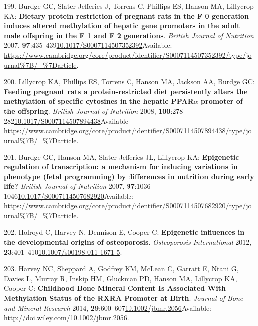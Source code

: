 \documentclass[
]{book}
\begin{document}
\leavevmode\hypertarget{ref-Burdge2007a}{}%
199. Burdge GC, Slater-Jefferies J, Torrens C, Phillips ES, Hanson MA, Lillycrop KA: \textbf{Dietary protein restriction of pregnant rats in the F 0 generation induces altered methylation of hepatic gene promoters in the adult male offspring in the F 1 and F 2 generations}. \emph{British Journal of Nutrition} 2007, \textbf{97}:435--439\href{https://doi.org/10.1017/S0007114507352392}{10.1017/S0007114507352392}Available: \url{https://www.cambridge.org/core/product/identifier/S0007114507352392/type/journal\%7B/_\%7Darticle}.

\leavevmode\hypertarget{ref-Lillycrop2008}{}%
200. Lillycrop KA, Phillips ES, Torrens C, Hanson MA, Jackson AA, Burdge GC: \textbf{Feeding pregnant rats a protein-restricted diet persistently alters the methylation of specific cytosines in the hepatic PPAR\(\alpha\) promoter of the offspring}. \emph{British Journal of Nutrition} 2008, \textbf{100}:278--282\href{https://doi.org/10.1017/S0007114507894438}{10.1017/S0007114507894438}Available: \url{https://www.cambridge.org/core/product/identifier/S0007114507894438/type/journal\%7B/_\%7Darticle}.

\leavevmode\hypertarget{ref-Burdge2007}{}%
201. Burdge GC, Hanson MA, Slater-Jefferies JL, Lillycrop KA: \textbf{Epigenetic regulation of transcription: a mechanism for inducing variations in phenotype (fetal programming) by differences in nutrition during early life?} \emph{British Journal of Nutrition} 2007, \textbf{97}:1036--1046\href{https://doi.org/10.1017/S0007114507682920}{10.1017/S0007114507682920}Available: \url{https://www.cambridge.org/core/product/identifier/S0007114507682920/type/journal\%7B/_\%7Darticle}.

\leavevmode\hypertarget{ref-Holroyd2012}{}%
202. Holroyd C, Harvey N, Dennison E, Cooper C: \textbf{Epigenetic influences in the developmental origins of osteoporosis}. \emph{Osteoporosis International} 2012, \textbf{23}:401--410\href{https://doi.org/10.1007/s00198-011-1671-5}{10.1007/s00198-011-1671-5}.

\leavevmode\hypertarget{ref-Harvey2014d}{}%
203. Harvey NC, Sheppard A, Godfrey KM, McLean C, Garratt E, Ntani G, Davies L, Murray R, Inskip HM, Gluckman PD, Hanson MA, Lillycrop KA, Cooper C: \textbf{Childhood Bone Mineral Content Is Associated With Methylation Status of the RXRA Promoter at Birth}. \emph{Journal of Bone and Mineral Research} 2014, \textbf{29}:600--607\href{https://doi.org/10.1002/jbmr.2056}{10.1002/jbmr.2056}Available: \url{http://doi.wiley.com/10.1002/jbmr.2056}.
\end{document}
